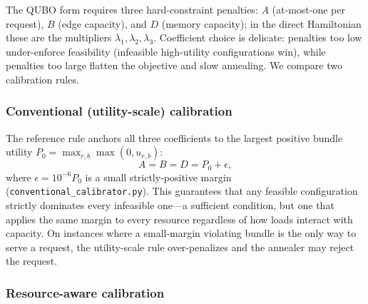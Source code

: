 \documentclass[10pt,a4paper]{article}
\begin{document}
The QUBO form requires three hard-constraint penalties: $A$
(at-most-one per request), $B$ (edge capacity), and $D$ (memory
capacity); in the direct Hamiltonian these are the multipliers
$\lambda_1, \lambda_2, \lambda_3$.  Coefficient choice is delicate:
penalties too low under-enforce feasibility (infeasible
high-utility configurations win), while penalties too large flatten
the objective and slow annealing.  We compare two calibration rules.

\subsubsection{Conventional (utility-scale) calibration}

The reference rule anchors all three coefficients to the largest
positive bundle utility $P_0 = \max_{r,b} \max(0, u_{r,b})$:
\begin{equation}
  A = B = D = P_0 + \epsilon,
  \label{eq:calib-conventional}
\end{equation}
where $\epsilon = 10^{-6}P_0$ is a small strictly-positive margin
(\texttt{conventional\_calibrator.py}).  This guarantees that any
feasible configuration strictly dominates every infeasible one---a
sufficient condition, but one that applies the same margin to every
resource regardless of how loads interact with capacity.  On instances
where a small-margin violating bundle is the only way to serve a
request, the utility-scale rule over-penalizes and the annealer may
reject the request.

\subsubsection{Resource-aware calibration}
\end{document}
